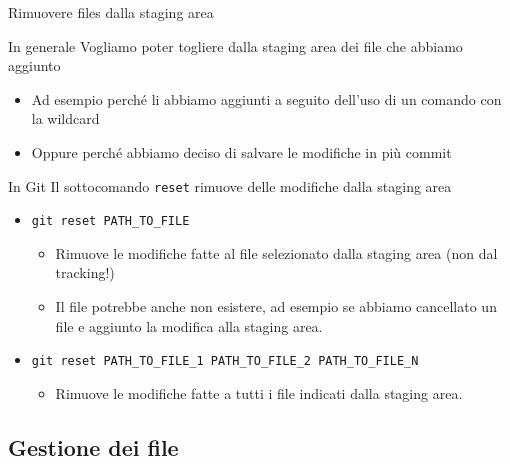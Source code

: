 \documentclass[presentation]{beamer}
\begin{document}
\begin{frame}{Rimuovere files dalla staging area}
	\begin{block}{In generale}	
		Vogliamo poter togliere dalla staging area dei file che abbiamo aggiunto
		\begin{itemize}
			\item Ad esempio perché li abbiamo aggiunti a seguito dell'uso di un comando con la wildcard
			\item Oppure perché abbiamo deciso di salvare le modifiche in più commit
		\end{itemize}
	\end{block}
	\begin{block}{In Git}
		Il sottocomando \texttt{reset} rimuove delle modifiche dalla staging area
		\begin{itemize}
			\item \texttt{git reset PATH\_TO\_FILE}
			\begin{itemize}
				\item Rimuove le modifiche fatte al file selezionato dalla staging area (non dal tracking!)
				\item Il file potrebbe anche non esistere, ad esempio se abbiamo cancellato un file e aggiunto la modifica alla staging area.
			\end{itemize}
			\item \texttt{git reset PATH\_TO\_FILE\_1 PATH\_TO\_FILE\_2 PATH\_TO\_FILE\_N}
			\begin{itemize}
				\item Rimuove le modifiche fatte a tutti i file indicati dalla staging area.
			\end{itemize}
		\end{itemize}
	\end{block}
\end{frame}

\subsection{Gestione dei file}
\end{document}
